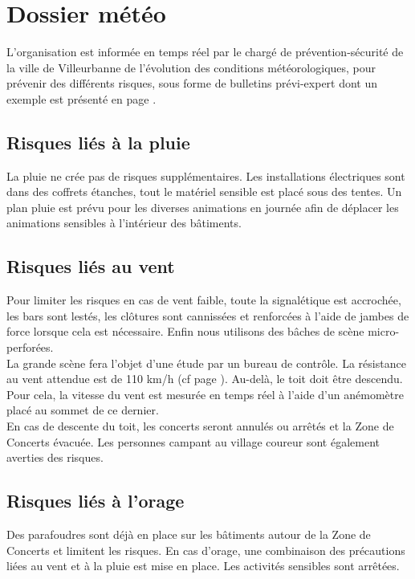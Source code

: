 \documentclass[hidelinks, paper=a4, fontsize=13pt]{report}
\begin{document}
\section{Dossier météo}

L’organisation est informée en temps réel par le chargé de prévention-sécurité de la ville de Villeurbanne de l’évolution des conditions météorologiques, pour prévenir des différents risques, sous forme de bulletins prévi-expert dont un exemple est présenté en page \pageref{refMeteo}.


\subsection{Risques liés à la pluie}
La pluie ne crée pas de risques supplémentaires. Les installations électriques sont dans des coffrets étanches, tout le matériel sensible est placé sous des tentes.
Un plan pluie est prévu pour les diverses animations en journée afin de déplacer les animations sensibles à l’intérieur des bâtiments.

\subsection{Risques liés au vent}

Pour limiter les risques en cas de vent faible, toute la signalétique est accrochée, les bars sont lestés, les clôtures sont cannissées et renforcées à l’aide de jambes de force lorsque cela est nécessaire. Enfin nous utilisons des bâches de scène micro-perforées.\\

La grande scène fera l'objet d'une étude par un bureau de contrôle. La résistance au vent attendue est de 110 km/h (cf page \pageref{refVentGS}). Au-delà, le toit doit être descendu. Pour cela, la vitesse du vent est mesurée en temps réel à l’aide d’un anémomètre placé au sommet de ce dernier. \\

En cas de descente du toit, les concerts seront annulés ou arrêtés et la Zone de Concerts évacuée. Les personnes campant au village coureur sont également averties des risques.

\subsection{Risques liés à l’orage}

Des parafoudres sont déjà en place sur les bâtiments autour de la Zone de Concerts et limitent les risques. En cas d’orage, une combinaison des précautions liées au vent et à la pluie est mise en place. Les activités sensibles sont arrêtées. 
\end{document}
